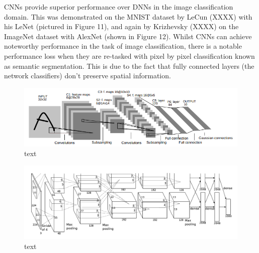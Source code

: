 \documentclass[a4paper]{article}
\begin{document}
CNNs provide superior performance over DNNs in the image classification domain. This was demonstrated on the MNIST dataset by LeCun (XXXX) with his LeNet (pictured in Figure 11), and again by Krizhevsky (XXXX) on the ImageNet dataset with AlexNet (shown in Figure 12). Whilst CNNs can achieve noteworthy performance in the task of image classification, there is a notable performance loss when they are re-tasked with pixel by pixel classification known as semantic segmentation. This is due to the fact that fully connected layers (the network classifiers) don't preserve spatial information.
\begin{figure}[h]
\centering
\includegraphics[scale=0.45]{lenet5}
\caption{text}
\end{figure}

\begin{figure}[h]
\centering
\includegraphics[scale=0.25]{alexnet}
\caption{text}
\end{figure}
\end{document}

